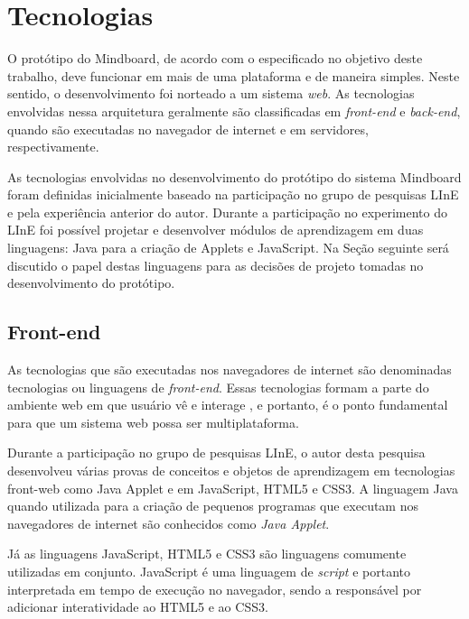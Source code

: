 \fi



\section{Tecnologias}
\label{sec:tecnologias}

O protótipo do Mindboard, de acordo com o especificado no objetivo deste trabalho, deve funcionar em mais de uma plataforma e de maneira simples. Neste sentido, o desenvolvimento foi norteado a um sistema \emph{web}. As tecnologias envolvidas nessa arquitetura geralmente são classificadas em \emph{front-end} e \emph{back-end}, quando são executadas no navegador de internet e em servidores, respectivamente.

As tecnologias envolvidas no desenvolvimento do protótipo do sistema Mindboard foram definidas inicialmente baseado na participação no grupo de pesquisas LInE e pela experiência anterior do autor. Durante a participação no experimento do LInE foi possível projetar e desenvolver módulos de aprendizagem em duas linguagens: Java para a criação de Applets e JavaScript. Na Seção seguinte será discutido o papel destas linguagens para as decisões de projeto tomadas no desenvolvimento do protótipo.

\subsection{Front-end}
\label{sec:frontend}

As tecnologias que são executadas nos navegadores de internet são denominadas tecnologias ou linguagens de \emph{front-end}. Essas tecnologias formam a parte do ambiente web em que usuário vê e interage \cite{treehouse}, e portanto, é o ponto fundamental para que um sistema web possa ser multiplataforma. 

Durante a participação no grupo de pesquisas LInE, o autor desta pesquisa desenvolveu várias provas de conceitos e objetos de aprendizagem em tecnologias front-web como Java Applet e em JavaScript, HTML5 e CSS3. A linguagem Java quando utilizada para a criação de pequenos programas que executam nos navegadores de internet são conhecidos como \emph{Java Applet}. 

Já as linguagens JavaScript, HTML5 e CSS3 são linguagens comumente utilizadas em conjunto. JavaScript é uma linguagem de \emph{script} e portanto interpretada em tempo de execução no navegador, sendo a responsável por adicionar interatividade ao HTML5 e ao CSS3. 

